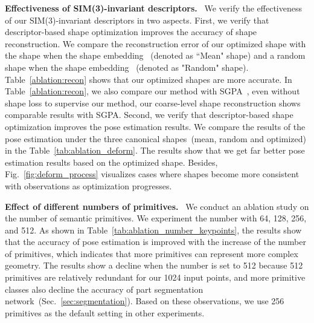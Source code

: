 \documentclass{article}
\newcommand{\revise}[1]{\textcolor{revise}{#1}}
\begin{document}
\textbf{Effectiveness of SIM(3)-invariant descriptors.}~
\revise{We verify the effectiveness of our SIM(3)-invariant descriptors in two aspects. First, we verify that descriptor-based shape optimization improves the accuracy of shape reconstruction. We compare the reconstruction error of our optimized shape with the shape when the shape embedding ~(denoted as ``Mean" shape) and a random shape when the shape embedding ~(denoted as "Random" shape).
Table~\ref{ablation:recon} shows that our optimized shapes are more accurate.  In Table~\ref{ablation:recon}, we also compare our method with SGPA~\cite{SGPA}, even without shape loss to supervise our method, our coarse-level shape reconstruction shows comparable results with SGPA. Second, we verify that descriptor-based shape optimization improves the pose estimation results. We compare the results of the pose estimation under the three canonical shapes~(mean, random and optimized) in the Table~\ref{tab:ablation_deform}. The results show that we get far better pose estimation results based on the optimized shape. Besides, Fig.~\ref{fig:deform_process} 
visualizes cases where shapes become more consistent with observations as optimization progresses.}

\textbf{Effect of different numbers of primitives.}~
\revise{
We conduct an ablation study on the number of semantic primitives. We experiment the number with 64, 128, 256, and 512. As shown in Table~\ref{tab:ablation_number_keypoints}, the results show that the accuracy of pose estimation is improved with the increase of the number of primitives, which indicates that more primitives can represent more complex geometry. The results show a decline when the number is set to 512 because 512 primitives are relatively redundant for our 1024 input points, and more primitive classes also decline the accuracy of part segmentation network~(Sec.~\ref{sec:segmentation}). Based on these observations, we use 256 primitives as the default setting in other experiments.}
\end{document}
